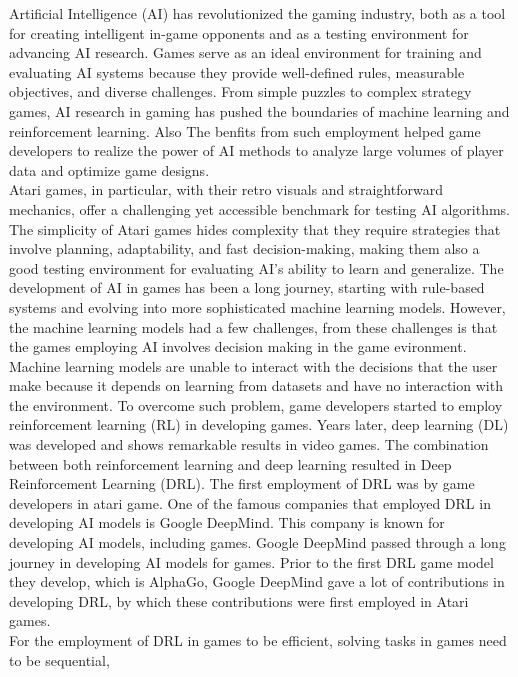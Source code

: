 Artificial Intelligence (AI) has revolutionized the gaming industry, 
both as a tool for creating intelligent in-game opponents and as a 
testing environment for advancing AI research. Games serve as an ideal 
environment for training and evaluating AI systems because they provide 
well-defined rules, measurable objectives, and diverse challenges. From 
simple puzzles to complex strategy games, AI research in gaming has pushed 
the boundaries of machine learning and reinforcement learning.
Also The benfits from such employment helped game developers to realize 
the power of AI methods to analyze large volumes of player data and optimize 
game designs. \cite{I1} \\
Atari games, in particular, with their retro visuals and straightforward mechanics, 
offer a challenging yet accessible benchmark for testing AI algorithms. The simplicity 
of Atari games hides complexity that they require strategies that involve planning, 
adaptability, and fast decision-making, making them also a good testing environment for 
evaluating AI's ability to learn and generalize.
The development of AI in games has been a long journey, starting with rule-based systems 
and evolving into more sophisticated machine learning models. However, the machine 
learning models had a few challenges, from these challenges is that the games employing 
AI involves decision making in the game evironment. Machine learning models are unable 
to interact with the decisions that the user make because it depends on learning from 
datasets and have no interaction with the environment. To overcome such problem, 
game developers started to employ reinforcement learning (RL) in developing games. 
Years later, deep learning (DL) was developed and shows remarkable results in video games\cite{I2}. 
The combination between both reinforcement learning and deep learning resulted in Deep Reinforcement 
Learning (DRL). The first employment of DRL was by game developers in atari game\cite{I3}.
One of the famous companies that employed DRL in developing AI models is Google DeepMind. 
This company is known for developing AI models, including games. Google DeepMind passed through a 
long journey in developing AI models for games. Prior to the first DRL game model they develop, 
which is AlphaGo, Google DeepMind gave a lot of contributions in developing DRL, by which these 
contributions were first employed in Atari games.\\
For the employment of DRL in games to be efficient, solving tasks in games need to be sequential, 
